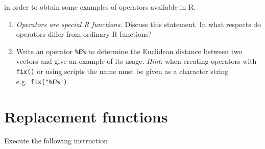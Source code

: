 \documentclass[
]{book}
\begin{document}
in order to obtain some examples of operators available in R.

\begin{enumerate}
\def\labelenumi{(\alph{enumi})}
\item
  \emph{{Operators are special R functions.}} Discuss this statement. In what respects do operators differ from ordinary R functions?
\item
  Write an operator \texttt{\%E\%} to determine the Euclidean distance between two vectors and give an example of its usage. \emph{Hint}: when creating operators with \texttt{fix()} or using scripts the name must be given as a character string e.g.~\texttt{fix("\%E\%")}.
\end{enumerate}

\section{Replacement functions}\label{replacement-functions}

Execute the following instruction
\end{document}
